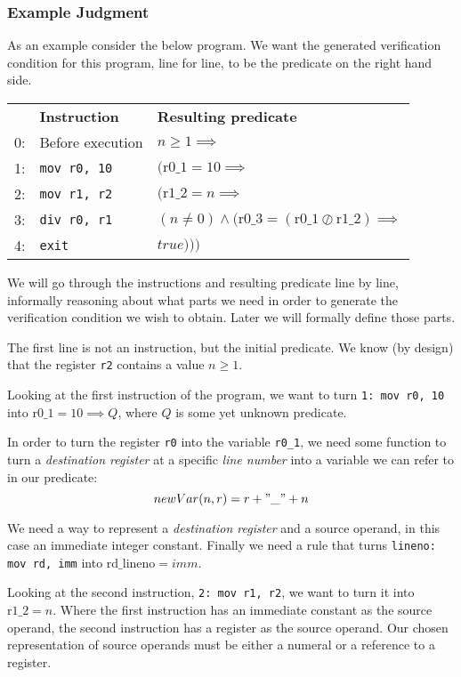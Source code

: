 


\subsubsection{Example Judgment}

As an example consider the below program. We want the generated verification condition for this program, line for line, to be the predicate on the right hand side.

\begin{tabular}{rll}
    & \textbf{Instruction} & \textbf{Resulting predicate}  \\
  0:& Before execution & $n \geq 1 \implies$ \\
  1:& \texttt{mov r0, 10} & $(\text{r0\_1} = 10 \implies $ \\
  2:& \texttt{mov r1, r2} & $(\text{r1\_2} = n \implies$  \\
  3:& \texttt{div r0, r1} & $(n \neq 0) \land (\text{r0\_3} = (\text{r0\_1} \oslash \text{r1\_2}) \implies$  \\
  4:& \texttt{exit} & $true)))$ & \\
\end{tabular}

We will go through the instructions and resulting predicate line by line, informally reasoning about what parts we need in order to generate the verification condition we wish to obtain. Later we will formally define those parts.

The first line is not an instruction, but the initial predicate. We know (by design) that the register \texttt{r2} contains a value $n \geq 1$. 

Looking at the first instruction of the program, we want to turn \texttt{1: mov r0, 10} into $\text{r0\_1} = 10 \implies Q$, where $Q$ is some yet unknown predicate.

In order to turn the register \texttt{r0} into the variable \texttt{r0\_1}, we need some function to turn a \textit{destination register} at a specific \textit{line number} into a variable we can refer to in our predicate:
\[
newVar (n, r) = r + "\_" + n
\]

We need a way to represent a \textit{destination register} and a source operand, in this case an immediate integer constant.
Finally we need a rule that turns \texttt{lineno: mov rd, imm} into $\text{rd\_lineno} = imm$.

Looking at the second instruction, \texttt{2: mov r1, r2}, we want to turn it into $\text{r1\_2} = n$.
Where the first instruction has an immediate constant as the source operand, the second instruction has a register as the source operand. Our chosen representation of source operands must be either a numeral or a reference to a register.

